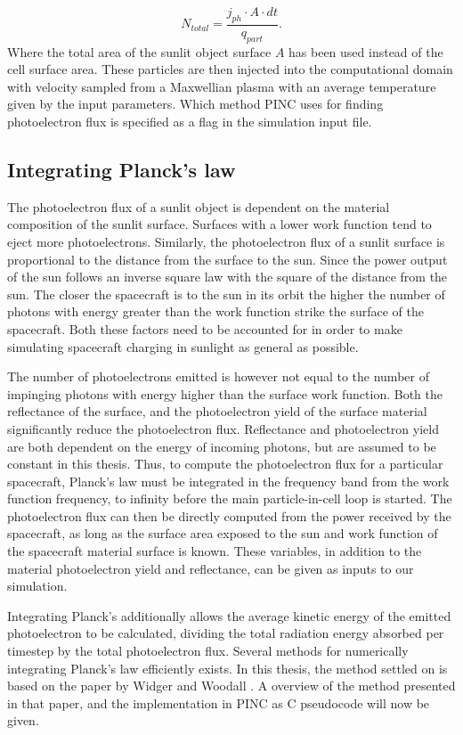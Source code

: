 \begin{equation}
    N_{total} =  \frac{j_{ph} \cdot A \cdot dt}{q_{part}}.
\end{equation}
Where the total area of the sunlit object surface $A$ has been used instead of the cell surface area. These particles are then injected into the computational domain with velocity sampled from a Maxwellian plasma with an average temperature given by the input parameters. Which method PINC uses for finding photoelectron flux is specified as a flag in the simulation input file.  

\subsection{Integrating Planck's law}

The photoelectron flux of a sunlit object is dependent on the material composition of the sunlit surface. Surfaces with a lower work function tend to eject more photoelectrons. Similarly, the photoelectron flux of a sunlit surface is proportional to the distance from the surface to the sun. Since the power output of the sun follows an inverse square law with the square of the distance from the sun. The closer the spacecraft is to the sun in its orbit the higher the number of photons with energy greater than the work function strike the surface of the spacecraft. Both these factors need to be accounted for in order to make simulating spacecraft charging in sunlight as general as possible. 

The number of photoelectrons emitted is however not equal to the number of impinging photons with energy higher than the surface work function. Both the reflectance of the surface, and the photoelectron yield of the surface material significantly reduce the photoelectron flux. Reflectance and photoelectron yield are both dependent on the energy of incoming photons, but are assumed to be constant in this thesis. Thus, to compute the photoelectron flux for a particular spacecraft, Planck's law must be integrated in the frequency band from the work function frequency, to infinity before the main particle-in-cell loop is started. The photoelectron flux can then be directly computed from the power received by the spacecraft, as long as the surface area exposed to the sun and work function of the spacecraft material surface is known. These variables, in addition to the material photoelectron yield and reflectance, can be given as inputs to our simulation.

Integrating Planck's additionally allows the average kinetic energy of the emitted photoelectron to be calculated, dividing the total radiation energy absorbed per timestep by the total photoelectron flux. Several methods for numerically integrating Planck's law efficiently exists. In this thesis, the method settled on is based on the paper by Widger and Woodall \parencite{Widger1976}. A overview of the method presented in that paper, and the implementation in PINC as C pseudocode will now be given.

